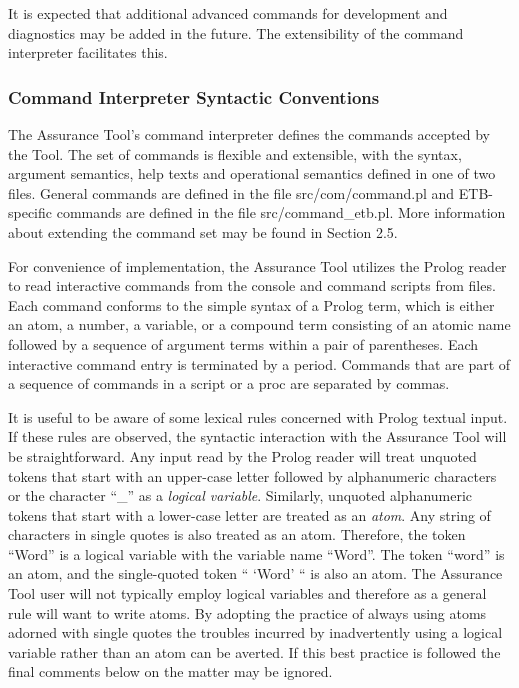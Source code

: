 \documentclass[12pt,twoside,a4paper]{article}
\begin{document}
It is expected that additional advanced commands for development and diagnostics may be added in the future. The extensibility of the command interpreter facilitates this.

\hypertarget{command-interpreter-syntactic-conventions}{%
\subsubsection{Command Interpreter Syntactic Conventions}\label{command-interpreter-syntactic-conventions}}

The Assurance Tool's command interpreter defines the commands accepted by the Tool. The set of commands is flexible and extensible, with the syntax, argument semantics, help texts and operational semantics defined in one of two files. General commands are defined in the file src/com/command.pl and ETB-specific commands are defined in the file src/command\_etb.pl. More information about extending the command set may be found in Section 2.5.

For convenience of implementation, the Assurance Tool utilizes the Prolog reader to read interactive commands from the console and command scripts from files. Each command conforms to the simple syntax of a Prolog term, which is either an atom, a number, a variable, or a compound term consisting of an atomic name followed by a sequence of argument terms within a pair of parentheses. Each interactive command entry is terminated by a period. Commands that are part of a sequence of commands in a script or a proc are separated by commas.

It is useful to be aware of some lexical rules concerned with Prolog textual input. If these rules are observed, the syntactic interaction with the Assurance Tool will be straightforward. Any input read by the Prolog reader will treat unquoted tokens that start with an upper-case letter followed by alphanumeric characters or the character ``\_'' as a \emph{logical variable}. Similarly, unquoted alphanumeric tokens that start with a lower-case letter are treated as an \emph{atom}. Any string of characters in single quotes is also treated as an atom. Therefore, the token ``Word'' is a logical variable with the variable name ``Word''. The token ``word'' is an atom, and the single-quoted token `` `Word' `` is also an atom. The Assurance Tool user will not typically employ logical variables and therefore as a general rule will want to write atoms. By adopting the practice of always using atoms adorned with single quotes the troubles incurred by inadvertently using a logical variable rather than an atom can be averted. If this best practice is followed the final comments below on the matter may be ignored.
\end{document}
